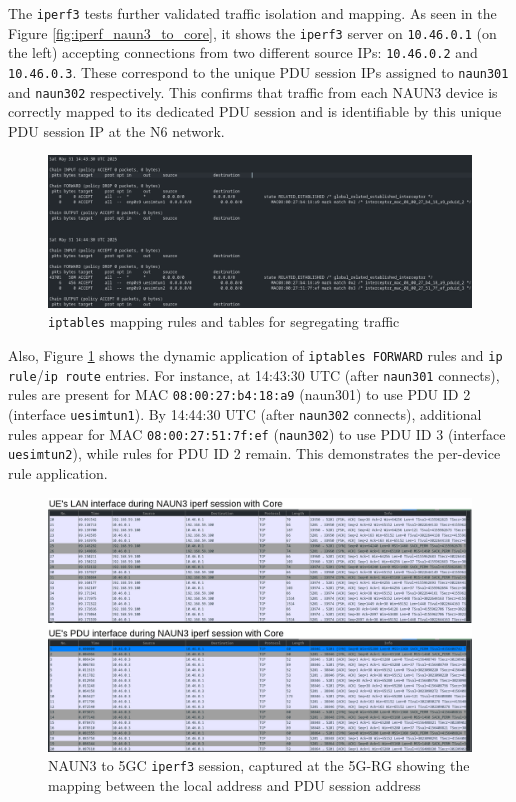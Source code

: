 The \texttt{iperf3} tests further validated traffic isolation and mapping. As seen in the Figure \ref{fig:iperf_naun3_to_core}, it shows the \texttt{iperf3} server on \texttt{10.46.0.1} (on the left) accepting connections from two different source \acp{IP}: \texttt{10.46.0.2} and \texttt{10.46.0.3}. These correspond to the unique \ac{PDU} session \acp{IP} assigned to \texttt{naun301} and \texttt{naun302} respectively. This confirms that traffic from each \ac{NAUN3} device is correctly mapped to its dedicated \ac{PDU} session and is identifiable by this unique \ac{PDU} session \ac{IP} at the N6 network.

\begin{figure}
    \centering
    \includegraphics[width=1\linewidth]{figs/iptable_mapping_rules.png}
    \caption{\texttt{iptables} mapping rules and tables for segregating traffic}
    \label{fig:iptable_mapping_rules}
\end{figure}

Also, Figure \ref{fig:iptable_mapping_rules} shows the dynamic application of \texttt{iptables FORWARD} rules and \texttt{ip rule}/\texttt{ip route} entries. For instance, at 14:43:30 \ac{UTC} (after \texttt{naun301} connects), rules are present for \ac{MAC} \texttt{08:00:27:b4:18:a9} (\ac{naun301}) to use \ac{PDU} ID 2 (interface \texttt{uesimtun1}). By 14:44:30 \ac{UTC} (after \texttt{naun302} connects), additional rules appear for \ac{MAC} \texttt{08:00:27:51:7f:ef} (\texttt{naun302}) to use \ac{PDU} ID 3 (interface \texttt{uesimtun2}), while rules for \ac{PDU} ID 2 remain. This demonstrates the per-device rule application.

\begin{figure}
    \centering
    \includegraphics[width=1\linewidth]{figs/naun3_to_core_ue_view.png}
    \caption{\ac{NAUN3} to \ac{5GC} \texttt{iperf3} session, captured at the \ac{5G-RG} showing the mapping between the local address and \ac{PDU} session address}
    \label{fig:naun3_to_core_ue_view}
\end{figure}

